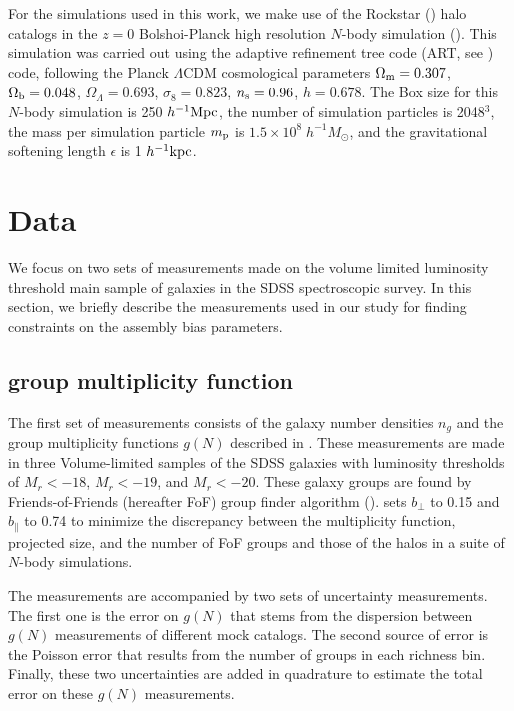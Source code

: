 \documentclass[12pt, preprint]{emulateapj}
\begin{document}
For the simulations used in this work, we make use of the Rockstar (\citealt{rockstar}) halo catalogs in the $z=0$ Bolshoi-Planck high 
resolution $N$-body simulation (\citealt{bolshoi}). This simulation was carried out using the adaptive refinement tree code 
(ART, see \citealt{art}) code, following the Planck $\Lambda$CDM cosmological parameters 
$\Omega_{\rm m} = 0.307$, $\Omega_{\rm b} = 0.048$, $\Omega_{\Lambda} = 0.693$, $\sigma_{8} = 0.823$, $n_{\rm s}=0.96$, 
$h=0.678$. The Box size for this $N$-body simulation is 250 $h^{-1} \rm{Mpc}$, the number of simulation particles is 2048$^3$, 
the mass per simulation particle $m_{\rm p}$ is $1.5 \times 10^{8} \; h^{-1} M_{\odot}$, and the gravitational softening length 
$\epsilon$ is 1 $h^{-1} \rm{kpc}$. 

\section{Data}\label{sec:data}

We focus on two sets of measurements made on the volume limited luminosity threshold main sample of galaxies in the SDSS spectroscopic survey. In this section, we briefly describe the measurements used in our study for finding constraints on the assembly bias parameters.

\subsection{group multiplicity function}

The first set of measurements consists of the galaxy number densities $n_{g}$ and the group multiplicity functions $g(N)$ described in \citealt{berlind2006}. These measurements are made in three Volume-limited samples of the SDSS galaxies with luminosity thresholds of $M_{r}<-18$, $M_{r}<-19$, and $M_{r}<-20$. These galaxy groups are found by Friends-of-Friends (hereafter FoF) group finder algorithm (\citealt{fof}). \citealt{berlind2006} sets $b_{\perp}$ to 0.15 and $b_{\parallel}$ to 0.74 to minimize the discrepancy between the multiplicity function, projected size, and the number of FoF groups and those of the halos in a suite of $N$-body simulations.

The measurements are accompanied by two sets of uncertainty measurements. The first one is the error on $g(N)$ that stems from the dispersion between $g(N)$ measurements of different mock catalogs. The second source of error is the Poisson error that results from the number of groups in each richness bin. Finally, these two uncertainties are added in quadrature 
to estimate the total error on these $g(N)$ measurements.
\end{document}
